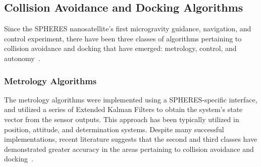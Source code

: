 \documentclass[journal, 10pt]{IEEEtran}
\begin{document}
\subsection{Collision Avoidance and Docking Algorithms}
Since the SPHERES nanosatellite's first microgravity guidance, navigation, and control experiment, there have been three classes of algorithms pertaining to collision avoidance and docking that have emerged: metrology, control, and autonomy~\cite{SPHERES_form}.

\subsubsection{Metrology Algorithms}
The metrology algorithms were implemented using a SPHERES-specific interface, and utilized a series of Extended Kalman Filters to obtain the system's state vector from the sensor outputs. This approach has been typically utilized in position, attitude, and determination systems. Despite many successful implementations, recent literature suggests that the second and third classes have demonstrated greater accuracy in the areas pertaining to collision avoidance and docking~\cite{SPHERES_form}.
\end{document}
